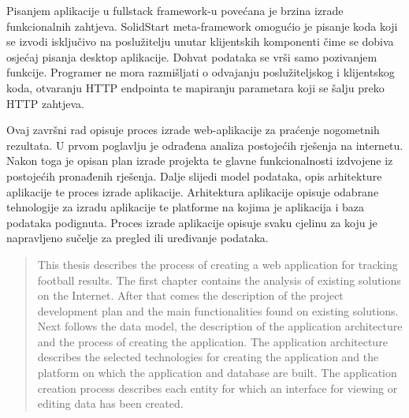 \documentclass[times, utf8, zavrsni]{fer}
\begin{document}
Pisanjem aplikacije u fullstack framework-u povećana je brzina izrade funkcionalnih zahtjeva.
SolidStart meta-framework omogućio je pisanje koda koji se izvodi isključivo na poslužitelju unutar klijentskih komponenti čime se dobiva osjećaj pisanja desktop aplikacije.
Dohvat podataka se vrši samo pozivanjem funkcije. Programer ne mora razmišljati o odvajanju poslužiteljskog i klijentskog koda, otvaranju HTTP endpointa te mapiranju parametara koji se šalju preko HTTP zahtjeva.




\begin{sazetak}
Ovaj završni rad opisuje proces izrade web-aplikacije za praćenje nogometnih rezultata.
U prvom poglavlju je odrađena analiza postojećih rješenja na internetu.
Nakon toga je opisan plan izrade projekta te glavne funkcionalnosti izdvojene iz postojećih pronađenih rješenja.
Dalje slijedi model podataka, opis arhitekture aplikacije te proces izrade aplikacije.
Arhitektura aplikacije opisuje odabrane tehnologije za izradu aplikacije te platforme na kojima je aplikacija i baza podataka podignuta.
Proces izrade aplikacije opisuje svaku cjelinu za koju je napravljeno sučelje za pregled ili uređivanje podataka.

\end{sazetak}

\begin{abstract}
This thesis describes the process of creating a web application for tracking football results.
The first chapter contains the analysis of existing solutions on the Internet.
After that comes the description of the project development plan and the main functionalities found on existing solutions.
Next follows the data model, the description of the application architecture and the process of creating the application.
The application architecture describes the selected technologies for creating the application and the platform on which the application and database are built.
The application creation process describes each entity for which an interface for viewing or editing data has been created.

\end{abstract}
\end{document}
